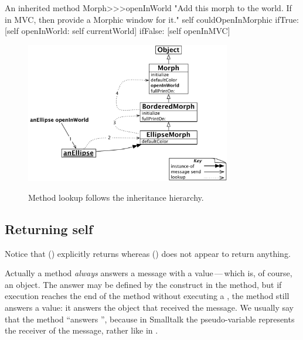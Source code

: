\documentclass[a4paper,10pt,twoside]{book}
\begin{document}
\begin{method}[openInWorld]{An inherited method}
Morph>>>openInWorld
	"Add this morph to the world.  If in MVC, then provide a Morphic window for it."
	self couldOpenInMorphic
		ifTrue: [self openInWorld: self currentWorld]
		ifFalse: [self openInMVC]
\end{method}

\begin{figure}[htb]
\begin{center}
	{\includegraphics[width=0.8\textwidth]{openInWorldLookup}}
\caption{Method lookup follows the inheritance hierarchy.}
\end{center}
\end{figure}

\subsection{Returning self}

Notice that  () explicitly returns  whereas  () does not appear to return anything.

Actually a method \emph{always} answers a message with a value\,---\,which is, of course, an object.
The answer may be defined by the \ct{^} construct in the method, but if execution reaches the end of the method without executing a \ct{^}, the method still answers a value: it answers the object that received the message.
We usually say that the method ``answers \self'', because in Smalltalk the pseudo-variable \self represents the receiver of the message, rather like  in .
\end{document}
